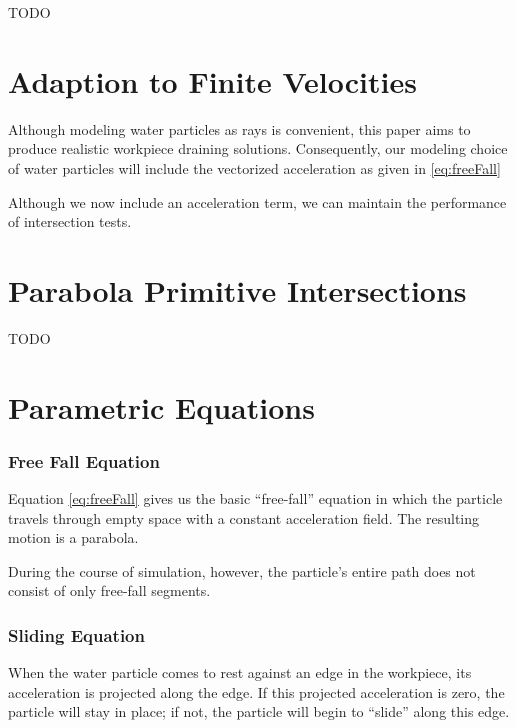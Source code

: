 TODO

\section{Adaption to Finite Velocities}

Although modeling water particles as rays is convenient, this paper aims to produce realistic workpiece draining solutions. Consequently, our modeling choice of water particles will include the vectorized acceleration as given in \eqref{eq:freeFall}


Although we now include an acceleration term, we can maintain the performance of intersection tests.

\section{Parabola Primitive Intersections}

TODO

\section{Parametric Equations}

		\subsubsection{Free Fall Equation}

Equation \eqref{eq:freeFall} gives us the basic ``free-fall'' equation in which the particle travels through empty space with a constant acceleration field. The resulting motion is a parabola.


During the course of simulation, however, the particle's entire path does not consist of only free-fall segments.

		\subsubsection{Sliding Equation}

When the water particle comes to rest against an edge in the workpiece, its acceleration is projected along the edge. If this projected acceleration is zero, the particle will stay in place; if not, the particle will begin to ``slide'' along this edge.

